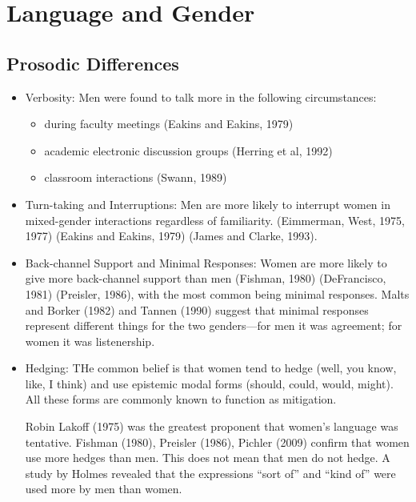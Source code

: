 \documentclass[../main.tex]{subfiles}
\begin{document}
    \chapter{Language and Gender}
        \section{Prosodic Differences}
            \begin{itemize}
                \item Verbosity: Men were found to talk more in the following circumstances: \begin{itemize}
                    \item during faculty meetings (Eakins and Eakins, 1979)
                    \item academic electronic discussion groups (Herring et al, 1992)
                    \item classroom interactions (Swann, 1989)
                \end{itemize}
                \item Turn-taking and Interruptions: Men are more likely to interrupt women in mixed-gender interactions regardless of familiarity. (Eimmerman, West, 1975, 1977) (Eakins and Eakins, 1979) (James and Clarke, 1993).
                \item Back-channel Support and Minimal Responses: Women are more likely to give more back-channel support than men (Fishman, 1980) (DeFrancisco, 1981) (Preisler, 1986), with the most common being minimal responses.
                Malts and Borker (1982) and Tannen (1990) suggest that minimal responses represent different things for the two genders---for men it was agreement; for women it was listenership.
                \item Hedging: THe common belief is that women tend to hedge (well, you know, like, I think) and use epistemic modal forms (should, could, would, might). All these forms are commonly known to function as mitigation. \par
                Robin Lakoff (1975) was the greatest proponent that women's language was tentative. Fishman (1980), Preisler (1986), Pichler (2009) confirm that women use more hedges than men. This does not mean that men do not hedge. A study by Holmes revealed that the expressions ``sort of'' and ``kind of'' were used more by men than women.
            \end{itemize}
\end{document}
